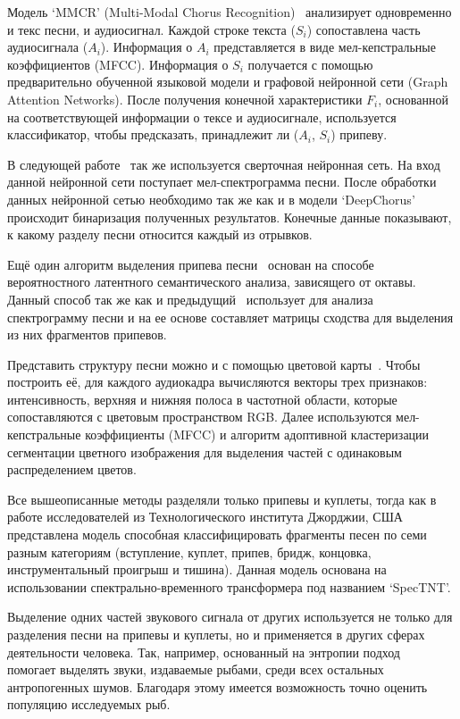 Модель `MMCR' (Multi-Modal Chorus Recognition)~\cite{MMCR} анализирует одновременно и текс песни, и аудиосигнал. Каждой строке текста ($S_i$) сопоставлена часть аудиосигнала ($A_i$). Информация о $A_i$ представляется в виде мел-кепстральные коэффициентов (MFCC). Информация о $S_i$ получается с помощью
предварительно обученной языковой модели и графовой нейронной сети (Graph Attention Networks). После получения конечной характеристики $F_i$, основанной на соответствующей информации о тексе и аудиосигнале, используется классификатор, чтобы предсказать, принадлежит ли ($A_i$, $S_i$) припеву.

В следующей работе~\cite{ByteDance} так же используется сверточная нейронная сеть. На вход данной нейронной сети поступает мел-спектрограмма песни. После обработки данных нейронной сетью необходимо так же как и в модели `DeepChorus'~\cite{DeepChorus} происходит бинаризация полученных результатов. Конечные данные показывают, к какому разделу песни относится каждый из отрывков.

Ещё один алгоритм выделения припева песни~\cite{OdPlsa} основан на способе вероятностного латентного семантического анализа, зависящего от октавы. Данный способ так же как и предыдущий~\cite{ByteDance} использует для анализа спектрограмму песни и на ее основе составляет матрицы сходства для выделения из них фрагментов припевов.

Представить структуру песни можно и с помощью цветовой карты~\cite{ColorMap}. Чтобы построить её, для каждого аудиокадра вычисляются векторы трех признаков: интенсивность, верхняя и нижняя полоса в частотной области, которые сопоставляются с цветовым пространством RGB. Далее используются мел-кепстральные коэффициенты (MFCC) и алгоритм адоптивной кластеризации сегментации цветного изображения для выделения частей с одинаковым распределением цветов. 

Все вышеописанные методы разделяли только припевы и куплеты, тогда как в работе исследователей из Технологического института Джорджии, США~\cite{Georgia} представлена модель способная классифицировать фрагменты песен по семи разным категориям (вступление, куплет, припев, бридж, концовка, инструментальный проигрыш и тишина). Данная модель основана на использовании спектрально-временного трансформера под названием `SpecTNT'. 

Выделение одних частей звукового сигнала от других используется не только для разделения песни на припевы и куплеты, но и применяется в других сферах деятельности человека. Так, например, основанный на энтропии подход~\cite{Fish} помогает выделять звуки, издаваемые рыбами, среди всех остальных антропогенных шумов. Благодаря этому имеется возможность точно оценить популяцию исследуемых рыб.


